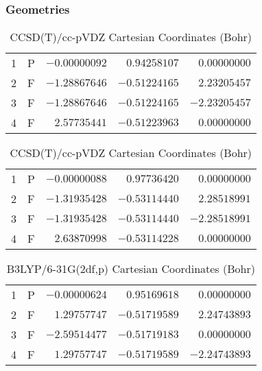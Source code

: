 \documentclass[10pt,oneside]{article}
\begin{document}
\clearpage

\subsection{}

\begin{table}[h!]
\subsubsection*{Geometries}
\begin{multicols}{2}
\centering
\caption{CCSD(T)/cc-pVTZ Cartesian Coordinates (Bohr)}
\begin{tabular}{llrrr}
\toprule
1  & P  & $-0.00000092$ & $ 0.94258107$ & $ 0.00000000$ \\
2  & F  & $-1.28867646$ & $-0.51224165$ & $ 2.23205457$ \\
3  & F  & $-1.28867646$ & $-0.51224165$ & $-2.23205457$ \\
4  & F  & $ 2.57735441$ & $-0.51223963$ & $ 0.00000000$ \\
\bottomrule
\end{tabular}
\caption{CCSD(T)/cc-pVDZ Cartesian Coordinates (Bohr)}
\begin{tabular}{llrrr}
\toprule
1  & P  & $-0.00000088$ & $ 0.97736420$ & $ 0.00000000$ \\
2  & F  & $-1.31935428$ & $-0.53114440$ & $ 2.28518991$ \\
3  & F  & $-1.31935428$ & $-0.53114440$ & $-2.28518991$ \\
4  & F  & $ 2.63870998$ & $-0.53114228$ & $ 0.00000000$ \\
\bottomrule
\end{tabular}
\end{multicols}
\end{table}

\begin{table}[h]
\centering
\caption{B3LYP/6-31G(2df,p) Cartesian Coordinates (Bohr)}
\begin{tabular}{llrrr}
\toprule
1  & P  & $-0.00000624$ & $ 0.95169618$ & $ 0.00000000$ \\
2  & F  & $ 1.29757747$ & $-0.51719589$ & $ 2.24743893$ \\
3  & F  & $-2.59514477$ & $-0.51719183$ & $ 0.00000000$ \\
4  & F  & $ 1.29757747$ & $-0.51719589$ & $-2.24743893$ \\
\bottomrule
\end{tabular}
\end{table}
\end{document}
